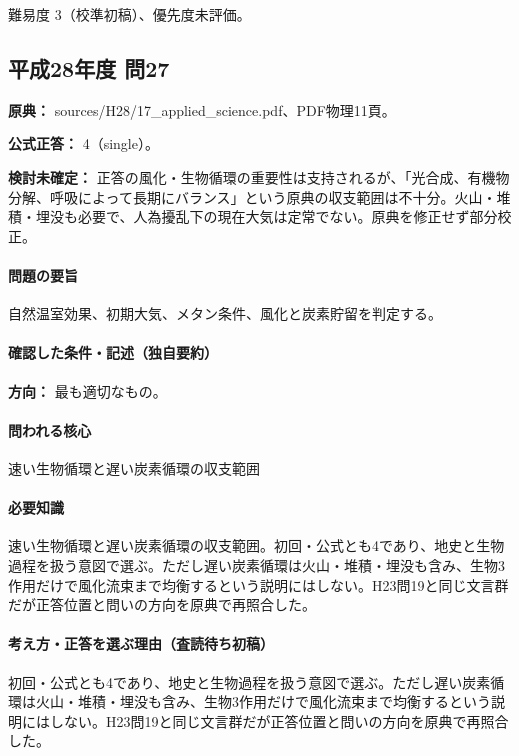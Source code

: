 \par 難易度 3（校準初稿）、優先度未評価。

\subsection{平成28年度 問27}
\label{q:h28-reg-applied-27}

\noindent\textbf{原典：} sources/H28/17\_applied\_science.pdf、PDF物理11頁。

\textbf{公式正答：} 4（single）。

\par\textbf{検討未確定：} 正答の風化・生物循環の重要性は支持されるが、「光合成、有機物分解、呼吸によって長期にバランス」という原典の収支範囲は不十分。火山・堆積・埋没も必要で、人為擾乱下の現在大気は定常でない。原典を修正せず部分校正。

\paragraph{問題の要旨} 自然温室効果、初期大気、メタン条件、風化と炭素貯留を判定する。

\paragraph{確認した条件・記述（独自要約）}\mbox{}\par

\noindent\textbf{方向：} 最も適切なもの。\par

\paragraph{問われる核心} 速い生物循環と遅い炭素循環の収支範囲

\paragraph{必要知識} 速い生物循環と遅い炭素循環の収支範囲。初回・公式とも4であり、地史と生物過程を扱う意図で選ぶ。ただし遅い炭素循環は火山・堆積・埋没も含み、生物3作用だけで風化流束まで均衡するという説明にはしない。H23問19と同じ文言群だが正答位置と問いの方向を原典で再照合した。

\paragraph{考え方・正答を選ぶ理由（査読待ち初稿）} 初回・公式とも4であり、地史と生物過程を扱う意図で選ぶ。ただし遅い炭素循環は火山・堆積・埋没も含み、生物3作用だけで風化流束まで均衡するという説明にはしない。H23問19と同じ文言群だが正答位置と問いの方向を原典で再照合した。

